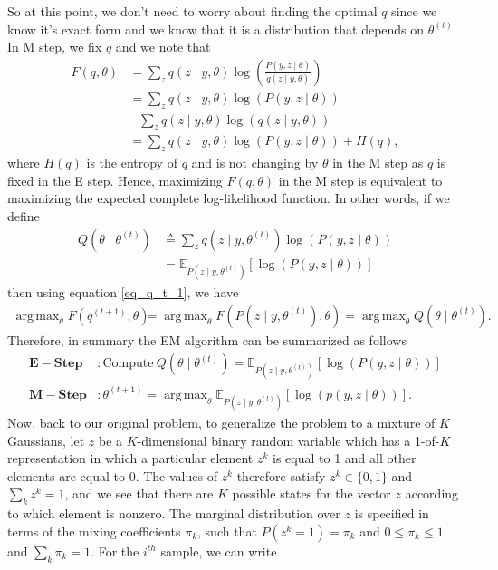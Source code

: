 \documentclass[10pt ]{article}
\DeclareMathOperator*{\argmaxA}{arg\,max}
\begin{document}
So at this point, we don't need to worry about finding the optimal $q$ since we know it's exact form and we know that it is a distribution that depends on $\theta^{(t)}$. In M step, we fix $q$ and we note that
\begin{align}
F(q, \theta) &=  \sum_z q(z \mid y, \theta) \log \left( \frac{P(y,z \mid \theta)}{q(z \mid y, \theta)} \right) \nonumber \\
&= \sum_z q(z \mid y, \theta) \log \left( P(y,z \mid \theta)  \right) \nonumber \\
&- \sum_z q(z \mid y, \theta) \log \left(q(z \mid y, \theta) \right) \nonumber \\
&= \sum_z q(z \mid y, \theta) \log \left( P(y,z \mid \theta)  \right) + H(q),
\end{align}
where $H(q)$ is the entropy of $q$ and is not changing by $\theta$ in the M step as $q$ is fixed in the E step. Hence, maximizing $F(q, \theta)$ in the M step is equivalent to maximizing the expected complete log-likelihood function. In other words, if we define 
\begin{align}
Q(\theta \mid \theta^{(t)}) &\triangleq \sum_z q(z \mid y, \theta^{(t)}) \log \left( P(y,z \mid \theta)  \right) \nonumber \\
&=\mathbb{E}_{P(z \mid y, \theta^{(t)})} \left[ \log \left( P(y, z \mid \theta)\right)\right]
\end{align}
then using equation \eqref{eq_q_t_1}, we have 
\begin{align}
\argmaxA_{\theta}  F(q^{(t+1)}, \theta) &= \argmaxA_{\theta} F\left(P(z \mid y, \theta^{(t)}), \theta \right) = \argmaxA_{\theta} Q(\theta \mid \theta^{(t)}).
\end{align}
Therefore, in summary the EM algorithm can be summarized as follows
\begin{align}
\mathbf{E-Step} &: \mathrm{Compute}~ Q(\theta \mid \theta^{(t)}) =\mathbb{E}_{P(z \mid y, \theta^{(t)})} \left[ \log \left( P(y, z \mid \theta)\right)\right] \label{eq_e_step} \\
\mathbf{M-Step} &: \theta^{(t+1)} = \argmaxA_{\theta} \mathbb{E}_{P(z \mid y, \theta^{(t)})} \left[ \log \left( p (y, z \mid \theta) \right) \right].
\label{eq_m_step}
\end{align}
Now, back to our original problem, to generalize the problem to a mixture of $K$ Gaussians, let $z$ be a $K$-dimensional binary random variable which has a 1-of-$K$ representation in which a particular element $z^k$ is equal to 1 and all other elements are equal to 0. The values of $z^k$ therefore satisfy $z^k \in \{0, 1\}$ and $\sum_k z^k = 1$, and we see that there are $K$ possible states for the vector $z$ according to which element is nonzero. The marginal distribution over $z$ is specified in terms of the mixing coefficients $\pi_k$, such that $P(z^k = 1) = \pi_k$ and $0 \le \pi_k \le 1$ and $\sum_k \pi_k =1$. For the $i^{th}$ sample, we can write
\end{document}
